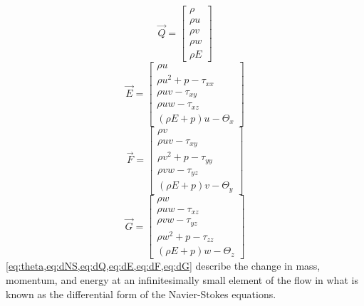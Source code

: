 \begin{equation}
\vec{Q} = \begin{bmatrix} \rho \\
  \rho u \\
  \rho v \\
  \rho w \\
  \rho E \end{bmatrix} \label{eq:dQ}
\end{equation}
%
\begin{equation}
\vec{E} = \begin{bmatrix} \rho u \\
  \rho u^2 + p - \tau_{xx} \\
  \rho uv - \tau_{xy} \\
  \rho uw - \tau_{xz} \\
  (\rho E + p)u - \Theta_x \end{bmatrix} \label{eq:dE}
\end{equation}
%
\begin{equation}
\vec{F} = \begin{bmatrix} \rho v \\
  \rho uv - \tau_{xy} \\
  \rho v^2 + p - \tau_{yy} \\
  \rho vw - \tau_{yz} \\
  (\rho E + p)v - \Theta_y \end{bmatrix} \label{eq:dF}
\end{equation}
%
\begin{equation}
\vec{G} = \begin{bmatrix} \rho w \\
  \rho uw - \tau_{xz} \\
  \rho vw - \tau_{yz} \\
  \rho w^2 + p - \tau_{zz} \\
  (\rho E + p)w - \Theta_z \end{bmatrix} \label{eq:dG}
\end{equation}
%
\cref{eq:theta,eq:dNS,eq:dQ,eq:dE,eq:dF,eq:dG} describe the change in mass, momentum, and energy at an infinitesimally small element of the flow in what is known as the differential form of the Navier-Stokes equations. 









